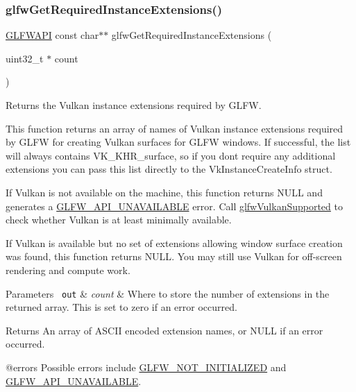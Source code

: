 \subsubsection{\texorpdfstring{glfwGetRequiredInstanceExtensions()}{glfwGetRequiredInstanceExtensions()}}
{\footnotesize\ttfamily \mbox{\hyperlink{glfw3_8h_a56da5036b2cc259351ae22fd6439bb47}{G\+L\+F\+W\+A\+PI}} const char$\ast$$\ast$ glfw\+Get\+Required\+Instance\+Extensions (\begin{DoxyParamCaption}\item[{uint32\+\_\+t $\ast$}]{count }\end{DoxyParamCaption})}



Returns the Vulkan instance extensions required by G\+L\+FW. 

This function returns an array of names of Vulkan instance extensions required by G\+L\+FW for creating Vulkan surfaces for G\+L\+FW windows. If successful, the list will always contains {\ttfamily V\+K\+\_\+\+K\+H\+R\+\_\+surface}, so if you don\textquotesingle{}t require any additional extensions you can pass this list directly to the {\ttfamily Vk\+Instance\+Create\+Info} struct.

If Vulkan is not available on the machine, this function returns {\ttfamily N\+U\+LL} and generates a \mbox{\hyperlink{group__errors_ga56882b290db23261cc6c053c40c2d08e}{G\+L\+F\+W\+\_\+\+A\+P\+I\+\_\+\+U\+N\+A\+V\+A\+I\+L\+A\+B\+LE}} error. Call \mbox{\hyperlink{group__vulkan_ga72e7c3757d9ff2333181a5569bb7c403}{glfw\+Vulkan\+Supported}} to check whether Vulkan is at least minimally available.

If Vulkan is available but no set of extensions allowing window surface creation was found, this function returns {\ttfamily N\+U\+LL}. You may still use Vulkan for off-\/screen rendering and compute work.


\begin{DoxyParams}[1]{Parameters}
\mbox{\texttt{ out}}  & {\em count} & Where to store the number of extensions in the returned array. This is set to zero if an error occurred. \\
\hline
\end{DoxyParams}
\begin{DoxyReturn}{Returns}
An array of A\+S\+C\+II encoded extension names, or {\ttfamily N\+U\+LL} if an error occurred.
\end{DoxyReturn}
@errors Possible errors include \mbox{\hyperlink{group__errors_ga2374ee02c177f12e1fa76ff3ed15e14a}{G\+L\+F\+W\+\_\+\+N\+O\+T\+\_\+\+I\+N\+I\+T\+I\+A\+L\+I\+Z\+ED}} and \mbox{\hyperlink{group__errors_ga56882b290db23261cc6c053c40c2d08e}{G\+L\+F\+W\+\_\+\+A\+P\+I\+\_\+\+U\+N\+A\+V\+A\+I\+L\+A\+B\+LE}}.

